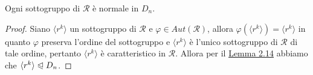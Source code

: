 \documentclass[11pt]{scrartcl}
\begin{document}
\begin{corollary}
    Ogni sottogruppo di $\mathcal{R}$ è normale in $D_n$.
\end{corollary}

\begin{proof}
    Siano $\langle r^k\rangle$ un sottogruppo di $\mathcal{R}$ e $\varphi
    \in Aut(\mathcal{R})$, allora $\varphi(\langle r^k\rangle) = \langle r^k\rangle$
    in quanto $\varphi$ preserva l'ordine del sottogruppo e $\langle r^k\rangle$
    è l'unico sottogruppo di $\mathcal{R}$ di tale ordine, pertanto $\langle r^k\rangle$
    è caratteristico in $\mathcal{R}$. Allora per il \hyperref[lemma1]{Lemma 2.14}
    abbiamo che $\langle r^k\rangle\trianglelefteqslant D_n$.
\end{proof}
\end{document}
